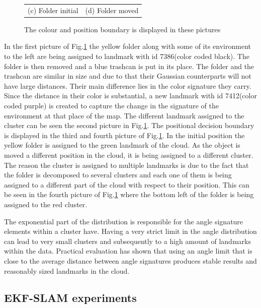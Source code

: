 \documentclass[twoside,hidelinks]{article}
\begin{document}
\begin{figure}
\begin{tabular}{cc}
(c) Folder initial  & (d) Folder moved \\[6pt]
\end{tabular}
\caption{The colour and position boundary is displayed in these pictures}
  \label{pip:bounds}
\end{figure}

In the first picture of Fig.\ref{pip:bounds} the yellow folder along with some of its environment to the left are being assigned to landmark with id 7386(color coded black). The folder is then removed and a blue trashcan is put in its place. The folder and the trashcan are similar in size and due to that their Gaussian counterparts will not have large distances. Their main difference lies in the color signature they carry. Since the distance in their color is substantial, a new landmark with id 7412(color coded purple) is created to capture the change in the signature of the environment at that place of the map. The different landmark assigned to the cluster can be seen the second picture in Fig.\ref{pip:bounds}. The positional decision boundary is displayed in the third and fourth picture of Fig.\ref{pip:bounds}. In the initial position the yellow folder is assigned to the green landmark of the cloud. As the object is moved a different position in the cloud, it is being assigned to a different cluster. The reason the cluster is assigned to multiple landmarks is due to the fact that the folder is decomposed to several clusters and each one of them is being assigned to a different part of the cloud with respect to their position. This can be seen in the fourth picture of Fig.\ref{pip:bounds} where the bottom left of the folder is being assigned to the red cluster.

The exponential part of the distribution is responsible for the angle signature elements within a cluster have. Having a very strict limit in the angle distribution can lead to very small clusters and subsequently to a high amount of landmarks within the data. Practical evaluation has shown that using an angle limit that is close to the average distance between angle signatures produces stable results and reasonably sized landmarks in the cloud.

\subsection{EKF-SLAM experiments}
\end{document}
